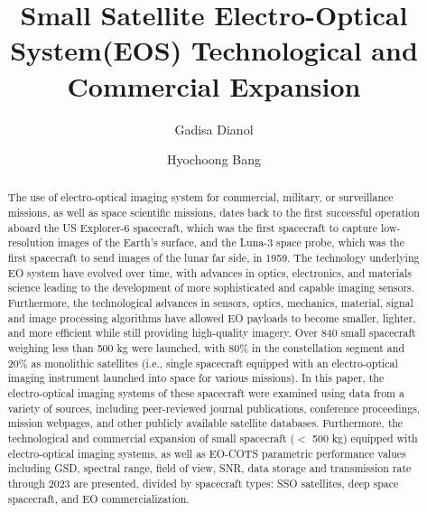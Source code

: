 \documentclass[final,5p,times,twocolumn]{elsarticle}
\begin{document}
\begin{frontmatter}

\title{Small Satellite Electro-Optical System(EOS) Technological and Commercial Expansion}

\author[1]{Gadisa Dianol}
\author[1]{Hyochoong Bang}

\begin{abstract}
The use of electro-optical imaging system for commercial, military, or surveillance missions, as well as space scientific missions, dates back to the first successful operation aboard the US Explorer-6 spacecraft, which was the first spacecraft to capture low-resolution images of the Earth's surface, and the Luna-3 space probe, which was the first spacecraft to send images of the lunar far side, in 1959. The technology underlying EO system have evolved over time, with advances in optics, electronics, and materials science leading to the development of more sophisticated and capable imaging sensors. Furthermore, the technological advances in sensors, optics, mechanics, material, signal and image processing algorithms have allowed EO payloads to become smaller, lighter, and more efficient while still providing high-quality imagery.
Over 840 small spacecraft weighing less than 500 kg were launched, with 80\% in the constellation segment and 20\% as monolithic satellites (i.e., single spacecraft equipped with an electro-optical imaging instrument launched into space for various missions). In this paper, the electro-optical imaging systems of these spacecraft were examined using data from a variety of sources, including peer-reviewed journal publications, conference proceedings, mission webpages, and other publicly available satellite databases. 
Furthermore, the technological and commercial expansion of small spacecraft ($<$ 500 kg) equipped with electro-optical imaging systems, as well as EO-COTS parametric performance values including GSD, spectral range, field of view, SNR, data storage and transmission rate through 2023 are presented, divided by spacecraft types: SSO satellites, deep space spacecraft, and EO commercialization.
\end{abstract}


\end{frontmatter}
\end{document}
